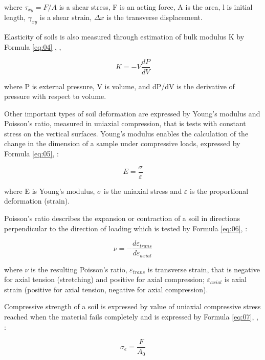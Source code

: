 \documentclass[a4paper,10pt]{article}
\begin{document}
where $\tau_{{xy}}=F/A$ is a shear stress, F is an acting force, A is the area, l is initial length, $\gamma_{xy}$ is a shear strain, $\Delta x$ is the transverse displacement. 

Elasticity of soils is also measured through estimation of bulk modulus K by Formula \ref{eq:04} \cite{Bezukhov1968}, \cite{FredlundRahardjo},  

\begin{equation}\label{eq:04}
	K=-V\frac{dP}{dV}
\end{equation}

where P is external pressure, V is volume, and dP/dV is the derivative of pressure with respect to volume.

Other important types of soil deformation are expressed by Young's modulus and Poisson's ratio, measured in uniaxial compression, that is tests with constant stress on the vertical surfaces. Young's modulus enables the calculation of the change in the dimension of a sample under compressive loads, expressed by Formula \ref{eq:05}, \cite{Millsetal1996}:  

\begin{equation}\label{eq:05}
	E=\frac{\sigma}{\varepsilon}
\end{equation}

where E is Young's modulus, $\sigma$ is the uniaxial stress and $\varepsilon$ is the proportional deformation (strain). 

Poisson's ratio describes the expansion or contraction of a soil in directions perpendicular to the direction of loading which is tested by Formula \ref{eq:06}, \cite{Millsetal1996}:  

\begin{equation}\label{eq:06}
	\nu=-\frac{d\varepsilon_{trans}}{d\varepsilon_{axial}}
\end{equation}

where $\nu$ is the resulting Poisson's ratio, $\varepsilon _{trans}$ is transverse strain, that is negative for axial tension (stretching) and positive for axial compression; $\varepsilon _{axial}$ is axial strain (positive for axial tension, negative for axial compression).

Compressive strength of a soil is expressed by value of uniaxial compressive stress reached when the material fails completely and is expressed by Formula \ref{eq:07}, \cite{Agterberg1964}, \cite{Agterberg1974}:  

\begin{equation}\label{eq:07}
	\sigma_{e}=\frac{F}{A_{0}}
\end{equation}
\end{document}
